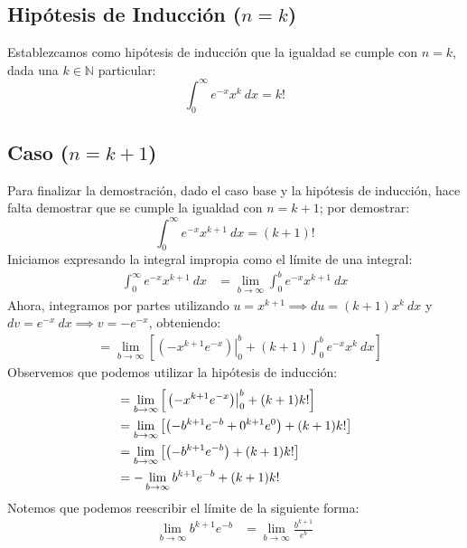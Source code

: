 \documentclass[12pt, a4paper]{article}
\begin{document}
\subsection{Hipótesis de Inducción (\texorpdfstring{\(n = k\)}{n = k})}

Establezcamos como hipótesis de inducción que la igualdad se cumple con \(n = k\), dada una \(k \in \mathbb{N} \) particular:
\[
    \int_0^\infty e^{-x}x^k \ dx = k!
\]

\subsection{Caso (\texorpdfstring{\(n = k+1\)}{n = k+1})}

Para finalizar la demostración, dado el caso base y la hipótesis de inducción, hace falta demostrar que se cumple la igualdad con \(n = k+1\); por demostrar:
\begin{equation} \label{eq:caso-demostrar}
\int_0^\infty e^{-x}x^{k+1}\ dx=(k+1)!
\end{equation}
Iniciamos expresando la integral impropia como el límite de una integral:
\begin{align*}
	\int_0^\infty e^{-x}x^{k+1}\ dx &= \lim_{b\to\infty}\int_0^b e^{-x}x^{k+1}\ dx
\end{align*}
Ahora, integramos por partes utilizando \(u=x^{k+1}\implies du=(k+1)x^k\ dx\) y \(dv=e^{-x}\ dx\implies v=-e^{-x}\), obteniendo:
\begin{align*}
	&= \lim_{b \to \infty} \left[ \left. \left( -x^{k+1} e^{-x} \right) \right|_{0}^{b} + (k+1) \int_{0}^{b} e^{-x} x^{k} \ dx \right]
\end{align*}
Observemos que podemos utilizar la hipótesis de inducción:
\begin{align} \label{eq:antes-limite}
	&= \lim_{b \to \infty} \left[ \left. \left( -x^{k+1} e^{-x} \right) \right|_{0}^{b} + (k+1) k! \right] \notag \\
	&= \lim_{b \to \infty} \left[ \left( -b^{k+1} e^{-b} + 0^{k+1} e^{0} \right) + (k+1) k! \right] \notag \\
	&= \lim_{b \to \infty} \left[ \left( -b^{k+1} e^{-b} \right) + (k+1) k! \right] \notag \\
	&= -\lim_{b \to \infty} b^{k+1} e^{-b} + (k+1) k!
\end{align}
Notemos que podemos reescribir el límite de la siguiente forma:
\begin{align*}
	\lim_{b \to \infty} b^{k+1} e^{-b} &= \lim_{b \to \infty} \frac{b^{k+1}}{e^{b}}
\end{align*}
\end{document}
